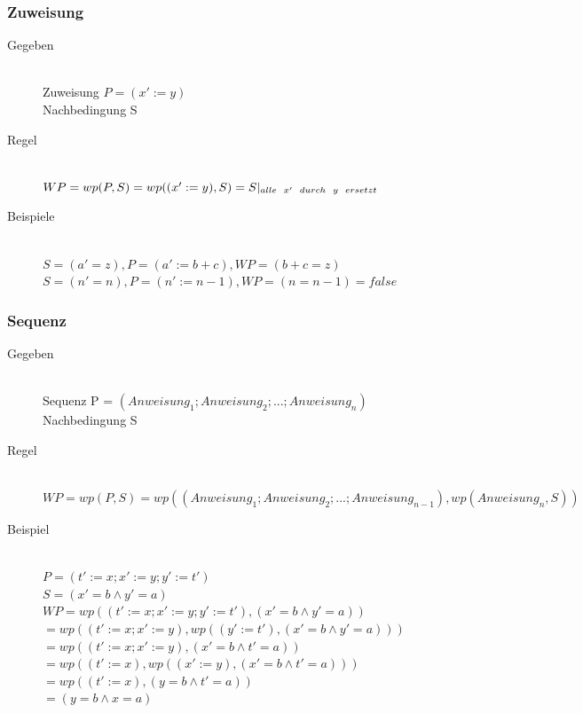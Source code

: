 \documentclass[a4paper,10pt]{article}
\begin{document}
\subsubsection{Zuweisung}
\begin{description}
	\item[Gegeben] \hfill \\
		Zuweisung $P = (x' := y)$ \\
		Nachbedingung S
	\item[Regel] \hfill \\
		$WP = wp(P, S) = wp((x' := y), S) = S |_{alle \hspace{2mm} x' \hspace{2mm} durch \hspace{2mm} y \hspace{2mm} ersetzt}$
	\item[Beispiele] \hfill \\
		$S = (a' = z), P = (a' := b + c), WP = (b + c = z)$ \\
		$S = (n' = n), P = (n' := n-1), WP = (n = n-1) = false$
\end{description}

\subsubsection{Sequenz}
\begin{description}
	\item[Gegeben] \hfill \\
		Sequenz P = $(Anweisung_1; Anweisung_2; ...; Anweisung_n)$ \\
		Nachbedingung S
	\item[Regel] \hfill \\
		$WP = wp(P, S) =
wp((Anweisung_1; Anweisung_2; ...; Anweisung_{n-1}), wp(Anweisung_n, S))$
	\item[Beispiel] \hfill \\
		$P = (t' := x; x' := y; y' := t')$ \\
		$S = (x' = b \wedge y' = a)$ \\
		$WP =wp((t':=x;x':=y;y':=t'),(x'=b \wedge y'=a))$ \\
		$= wp((t' := x; x' := y), wp((y' := t'), (x' = b \wedge y' = a)))$ \\
		$= wp((t' := x; x' := y), (x' = b \wedge t' = a))$ \\
		$= wp((t' := x), wp((x' := y), (x' = b \wedge t' = a)))$ \\
		$= wp((t' := x), (y = b \wedge t' = a))$ \\
		$= (y = b \wedge x = a)$
\end{description}
\end{document}
